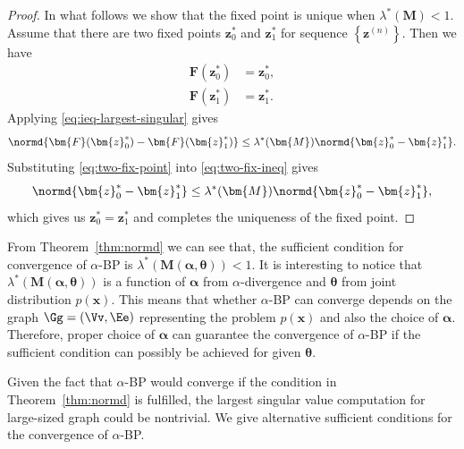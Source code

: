 \begin{proof}
  In what follows we show that the fixed point is unique when $\lambda^{\ast}(\bm{M})<1$. Assume that there are two fixed points $\bm{z}_0^{\ast}$ and $\bm{z}_1^{\ast}$ for sequence $\left\{ \bm{z}^{(n)} \right\}$. Then we have
  \begin{align}\label{eq:two-fix-point}
    \bm{F}(\bm{z}_0^{\ast}) &= \bm{z}_0^{\ast}, \nonumber\\
    \bm{F}(\bm{z}_1^{\ast}) &= \bm{z}_1^{\ast}. 
  \end{align}
  Applying \eqref{eq:ieq-largest-singular} gives
  \begin{equation}\label{eq:two-fix-ineq}
    \normd{\bm{F}(\bm{z}_0^{\ast}) - \bm{F}(\bm{z}_1^{\ast})} \leq
    \lambda^{\ast}(\bm{M})\normd{\bm{z}_0^{\ast} - \bm{z}_1^{\ast}}.
  \end{equation}
  Substituting \eqref{eq:two-fix-point} into \eqref{eq:two-fix-ineq}
  gives
  \begin{equation}
    \normd{\bm{z}_0^{\ast} - \bm{z}_1^{\ast}} \leq
    \lambda^{\ast}(\bm{M})\normd{\bm{z}_0^{\ast} - \bm{z}_1^{\ast}},
  \end{equation}
  which gives us $\bm{z}_0^{\ast} = \bm{z}_1^{\ast}$ and completes the uniqueness of the fixed point.
\end{proof}

\begin{remark}
  From Theorem~\ref{thm:normd} we can see that, the sufficient condition for convergence of $\alpha$-BP is $\lambda^{\ast}(\bm{M}(\bm{\alpha}, \bm{\theta})) < 1$. It is interesting to notice that $\lambda^{\ast}(\bm{M}(\bm{\alpha}, \bm{\theta}))$ is a function of $\bm{\alpha}$ from $\alpha$-divergence and $\bm{\theta}$ from joint distribution $p(\bm{x})$. This means that whether $\alpha$-BP can converge depends on the graph $\Gg= (\Vv, \Ee)$ representing the problem $p(\bm{x})$ and also the choice of $\bm{\alpha}$. Therefore, proper choice of $\bm{\alpha}$ can guarantee the convergence of $\alpha$-BP if the sufficient condition can possibly be achieved for given $\bm{\theta}$.
\end{remark}


Given the fact that $\alpha$-BP would converge if the condition in Theorem~\ref{thm:normd} is fulfilled, the largest singular value computation for large-sized graph could be nontrivial. We give alternative sufficient conditions for the convergence of $\alpha$-BP.

